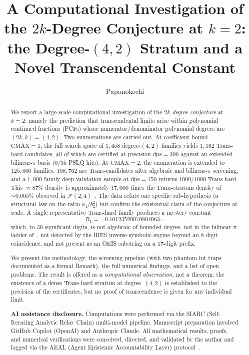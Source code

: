 \documentclass[11pt,a4paper]{amsart}
\title[A Computational Investigation of $\FF(4,3)$ at Degree $(4,2)$]%
{A Computational Investigation of the $2k$-Degree Conjecture at $k=2$:
the Degree-$(4,2)$ Stratum and a Novel Transcendental Constant}
\author{Papanokechi}
\theoremstyle{definition}
\theoremstyle{remark}
\newcommand{\FF}{\mathcal{F}}
\newcommand{\dps}{\mathrm{dps}}
\begin{document}
\begin{abstract}
We report a large-scale computational investigation of the
\emph{$2k$-degree conjecture} at $k=2$: namely the prediction that
transcendental limits arise within polynomial continued fractions
(PCFs) whose numerator/denominator polynomial degrees are
$(2k,k)=(4,2)$.  Two enumerations are carried out.  At coefficient
bound $\mathrm{CMAX}=1$, the full search space of $1{,}458$ degree-$(4,2)$
families yields $1{,}162$ Trans-hard candidates, all of which are
certified at precision $\dps=300$ against an extended bilinear-$\pi$
basis ($0/35$ PSLQ hits).  At $\mathrm{CMAX}=2$, the enumeration is
extended to $125{,}000$ families: $108{,}762$ are Trans-candidates after
algebraic and bilinear-$\pi$ screening, and a $1{,}000$-family
deep-validation sample at $\dps=150$ returns $1000/1000$ Trans-hard.
This $\approx 87\%$ density is approximately $17{,}000$
times the Trans-stratum density of $\sim 0.005\%$ observed
in $\FF(2,4)$~\cite{PCF24}.
The data refute one specific sub-hypothesis (a structural law on the
ratio $a_4/b_2^2$) but confirm the existential claim of the conjecture
at scale.  A single representative Trans-hard family produces a
mystery constant
\[
  R_1 = -0.10123520070804963\ldots
\]
which, to $30$ significant digits, is not algebraic of bounded degree,
not in the bilinear-$\pi$ ladder of~\cite{PCF24}, not detected by the
RIES inverse-symbolic engine beyond an $8$-digit coincidence, and not
present as an OEIS substring on a $17$-digit prefix.

We present the methodology, the screening pipeline (with two
phantom-hit traps documented as a formal Remark), the full numerical
findings, and a list of open problems.  The result is offered as a
\emph{computational observation}, not a theorem: the existence of a
dense Trans-hard stratum at degree~$(4,2)$ is established to the
precision of the certificates, but no proof of transcendence is given
for any individual limit.

\medskip\noindent\textbf{AI assistance disclosure.}
Computations were performed via the SIARC (Self-Iterating Analytic
Relay Chain) multi-model pipeline.  Manuscript preparation involved
GitHub Copilot (OpenAI) and Anthropic Claude.  All mathematical
results, proofs, and numerical verifications were conceived, directed,
and validated by the author and logged via the AEAL (Agent Epistemic
Accountability Layer) protocol~\cite{aeal}.
\end{abstract}

\maketitle
\end{document}
